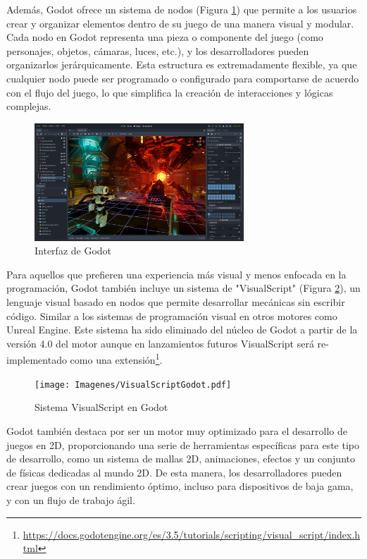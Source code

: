 Además, Godot ofrece un sistema de nodos (Figura \ref{fig:Godot_Figure}) que permite a los usuarios crear y organizar elementos dentro de su juego de una manera visual y modular. Cada nodo en Godot representa una pieza o componente del juego (como personajes, objetos, cámaras, luces, etc.), y los desarrolladores pueden organizarlos jerárquicamente. Esta estructura es extremadamente flexible, ya que cualquier nodo puede ser programado o configurado para comportarse de acuerdo con el flujo del juego, lo que simplifica la creación de interacciones y lógicas complejas.
\begin{figure}[t]
	\centering
	\includegraphics[width = 0.7\textwidth]{Imagenes/Godot.jpg}
	\caption{Interfaz de Godot}
	\label{fig:Godot_Figure}
\end{figure}

Para aquellos que prefieren una experiencia más visual y menos enfocada en la programación, Godot también incluye un sistema de "VisualScript" (Figura \ref{fig:Godot_VisualScript_Figure}), un lenguaje visual basado en nodos que permite desarrollar mecánicas sin escribir código. Similar a los sistemas de programación visual en otros motores como Unreal Engine. Este sistema ha sido eliminado del núcleo de Godot a partir de la versión 4.0 del motor aunque en lanzamientos futuros VisualScript será re-implementado como una extensión\footnote{\url{https://docs.godotengine.org/es/3.5/tutorials/scripting/visual_script/index.html}}.

\begin{figure}[t]
	\centering
	\texttt{[image: Imagenes/VisualScriptGodot.pdf]}
	\caption{Sistema VisualScript en Godot}
	\label{fig:Godot_VisualScript_Figure}
\end{figure}
Godot también destaca por ser un motor muy optimizado para el desarrollo de juegos en 2D, proporcionando una serie de herramientas específicas para este tipo de desarrollo, como un sistema de mallas 2D, animaciones, efectos y un conjunto de físicas dedicadas al mundo 2D. De esta manera, los desarrolladores pueden crear juegos con un rendimiento óptimo, incluso para dispositivos de baja gama, y con un flujo de trabajo ágil.

